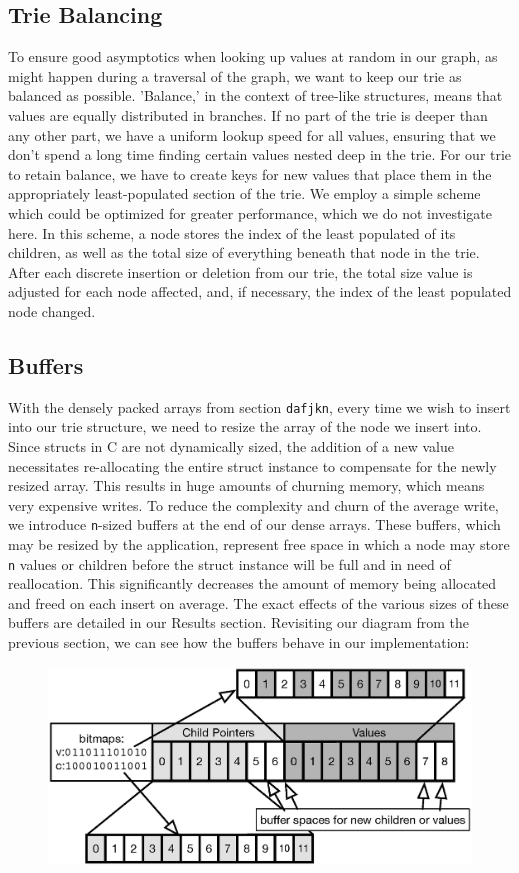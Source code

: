\documentclass[preprint]{sigplanconf}
\begin{document}
\subsection{Trie Balancing}
To ensure good asymptotics when looking up values at random in our graph, as might happen during a traversal of the graph, we want to keep our trie as balanced as possible.
'Balance,' in the context of tree-like structures, means that values are equally distributed in branches.
If no part of the trie is deeper than any other part, we have a uniform lookup speed for all values, ensuring that we don't spend a long time finding certain values nested deep in the trie.
For our trie to retain balance, we have to create keys for new values that place them in the appropriately least-populated section of the trie.
We employ a simple scheme which could be optimized for greater performance, which we do not investigate here.
In this scheme, a node stores the index of the least populated of its children, as well as the total size of everything beneath that node in the trie.
After each discrete insertion or deletion from our trie, the total size value is adjusted for each node affected, and, if necessary, the index of the least populated node changed.

\subsection{Buffers}
With the densely packed arrays from section \texttt{dafjkn}, every time we wish to insert into our trie structure, we need to resize the array of the node we insert into.
Since structs in C are not dynamically sized, the addition of a new value necessitates re-allocating the entire struct instance to compensate for the newly resized array.
This results in huge amounts of churning memory, which means very expensive writes.
To reduce the complexity and churn of the average write, we introduce \texttt{n}-sized buffers at the end of our dense arrays.
These buffers, which may be resized by the application, represent free space in which a node may store \texttt{n} values or children before the struct instance will be full and in need of reallocation.
This significantly decreases the amount of memory being allocated and freed on each insert on average. The exact effects of the various sizes of these buffers are detailed in our Results section.
Revisiting our diagram from the previous section, we can see how the buffers behave in our implementation:
\begin{figure}[H]
\includegraphics[scale=.42]{buffers}
\centering
\end{figure}
\end{document}
